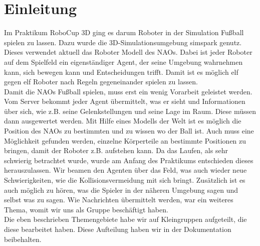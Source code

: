 \section{Einleitung}

Im Praktikum RoboCup 3D ging es darum Roboter in der Simulation Fußball spielen zu lassen. Dazu wurde die 3D-Simulationsumgebung simspark genutz. Dieses verwendet aktuell das Roboter Modell des NAOs. Dabei ist jeder Roboter auf dem Spielfeld ein eigenständiger Agent, der seine Umgebung wahrnehmen kann, sich bewegen kann und Entscheidungen trifft. Damit ist es möglich elf gegen elf Roboter nach Regeln gegeneinander spielen zu lassen.\\
Damit die NAOs Fußball spielen, muss erst ein wenig Vorarbeit geleistet werden. Vom Server bekommt jeder Agent übermittelt, was er sieht und Informationen über sich, wie z.B. seine Gelenkstellungen und seine Lage im Raum. Diese müssen dann ausgewertet werden. Mit Hilfe eines Modells der Welt ist es möglich die Position des NAOs zu bestimmten und zu wissen wo der Ball ist. Auch muss eine Möglichkeit gefunden werden, einzelne Körperteile an bestimmte Positionen zu bringen, damit der Roboter z.B. aufstehen kann. Da das Laufen, als sehr schwierig betrachtet wurde, wurde am Anfang des Praktikums entschieden dieses herauszulassen. Wir beamen den Agenten über das Feld, was auch wieder neue Schwierigkeiten, wie die Kollisionsvermeidung mit sich bringt. Zusätzlich ist es auch möglich zu hören, was die Spieler in der näheren Umgebung sagen und selbst was zu sagen. Wie Nachrichten übermittelt werden, war ein weiteres Thema, womit wir uns als Gruppe beschäftigt haben.\\
Die eben beschrieben Themengebiete habe wir auf Kleingruppen aufgeteilt, die diese bearbeitet haben. Diese Aufteilung haben wir in der Dokumentation beibehalten.